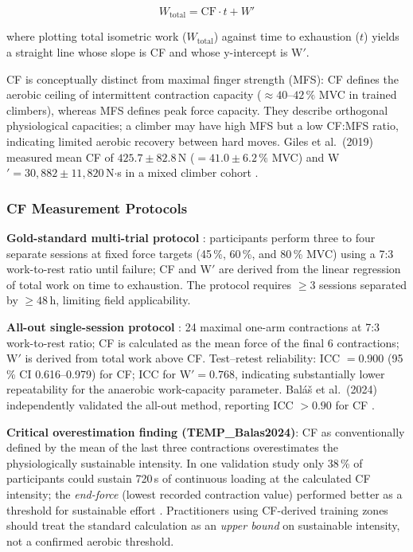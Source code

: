 \[
  W_{\text{total}} = \mathrm{CF} \cdot t + W'
\]

where plotting total isometric work ($W_{\text{total}}$) against time to exhaustion ($t$) yields a straight line whose slope is CF and whose y-intercept is W$'$.

CF is conceptually distinct from maximal finger strength (MFS): CF defines the aerobic ceiling of intermittent contraction capacity (${\approx}40$--$42\,\%$ MVC in trained climbers), whereas MFS defines peak force capacity.
They describe orthogonal physiological capacities; a climber may have high MFS but a low CF:MFS ratio, indicating limited aerobic recovery between hard moves.
Giles et al.\ (2019) measured mean CF of $425.7 \pm 82.8$\,N ($= 41.0 \pm 6.2\,\%$ MVC) and W$' = 30{,}882 \pm 11{,}820$\,N$\cdot$s in a mixed climber cohort \cite{GCT+19}.

\subsubsection{CF Measurement Protocols}

\textbf{Gold-standard multi-trial protocol} \cite{GCT+19}: participants perform three to four separate sessions at fixed force targets (45\,\%, 60\,\%, and 80\,\% MVC) using a 7:3 work-to-rest ratio until failure; CF and W$'$ are derived from the linear regression of total work on time to exhaustion.
The protocol requires $\geq 3$ sessions separated by $\geq 48$\,h, limiting field applicability.

\textbf{All-out single-session protocol} \cite{GHM+21}: 24 maximal one-arm contractions at 7:3 work-to-rest ratio; CF is calculated as the mean force of the final 6 contractions; W$'$ is derived from total work above CF.
Test--retest reliability: ICC $= 0.900$ (95\,\% CI 0.616--0.979) for CF; ICC for W$'= 0.768$, indicating substantially lower repeatability for the anaerobic work-capacity parameter.
Bal\'{a}\v{s} et al.\ (2024) independently validated the all-out method, reporting ICC $> 0.90$ for CF \cite{BGJ+24}.

\textbf{Critical overestimation finding (TEMP\_Balas2024)}: CF as conventionally defined by the mean of the last three contractions overestimates the physiologically sustainable intensity.
In one validation study only 38\,\% of participants could sustain 720\,s of continuous loading at the calculated CF intensity; the \emph{end-force} (lowest recorded contraction value) performed better as a threshold for sustainable effort \cite{BGJ+24}.
Practitioners using CF-derived training zones should treat the standard calculation as an \emph{upper bound} on sustainable intensity, not a confirmed aerobic threshold.

